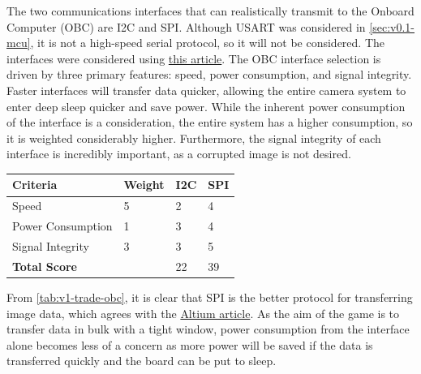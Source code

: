 The two communications interfaces that can realistically transmit to the Onboard Computer (OBC) are I2C and SPI. Although USART was considered in \autoref{sec:v0.1-mcu}, it is not a high-speed serial protocol, so it will not be considered. The interfaces were considered using \href{https://resources.altium.com/p/spi-versus-i2c-how-choose-best-protocol-your-memory-chips}{this article}.
\nl
The OBC interface selection is driven by three primary features: speed, power consumption, and signal integrity. Faster interfaces will transfer data quicker, allowing the entire camera system to enter deep sleep quicker and save power. While the inherent power consumption of the interface is a consideration, the entire system has a higher consumption, so it is weighted considerably higher. Furthermore, the signal integrity of each interface is incredibly important, as a corrupted image is not desired.

\begin{indentedtable}
    \centering
    \begin{tabular}{|l|l|l|l|}
        \hline
        \textbf{Criteria} & \textbf{Weight} & \textbf{I2C} & \textbf{SPI} \\
        \hline
        Speed & 5 & 2 & 4 \\
        \hline
        Power Consumption & 1 & 3 & 4 \\
        \hline
        Signal Integrity & 3 & 3 & 5 \\
        \hline
        \hline
        \textbf{Total Score} &  & 22 & 39 \\
        \hline
    \end{tabular}
    \caption{C2Sv1 OBC interface protocol trade study.}
    \label{tab:v1-trade-obc}
\end{indentedtable}

From \autoref{tab:v1-trade-obc}, it is clear that SPI is the better protocol for transferring image data, which agrees with the \href{https://resources.altium.com/p/spi-versus-i2c-how-choose-best-protocol-your-memory-chips}{Altium article}. As the aim of the game is to transfer data in bulk with a tight window, power consumption from the interface alone becomes less of a concern as more power will be saved if the data is transferred quickly and the board can be put to sleep.